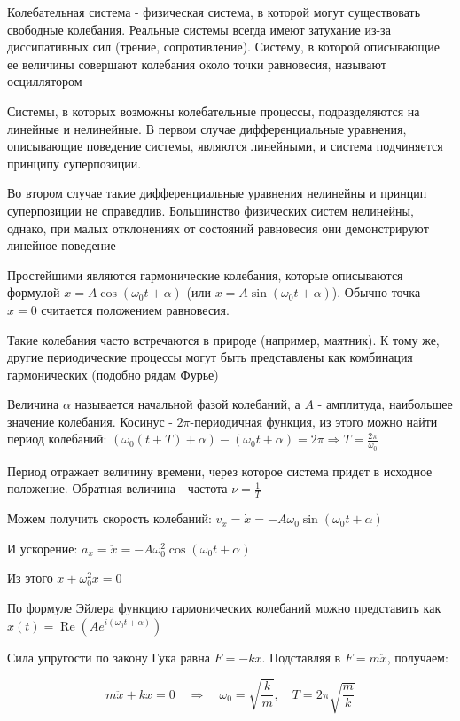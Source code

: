 \documentclass[12pt]{article}
\begin{document}
Колебательная система - физическая система, в которой могут существовать свободные колебания. 
Реальные системы всегда имеют затухание из-за диссипативных сил (трение, сопротивление).
Систему, в которой описывающие ее величины совершают колебания около точки равновесия, называют осциллятором

Системы, в которых возможны колебательные процессы, подразделяются на линейные и нелинейные.
В первом случае дифференциальные уравнения, описывающие поведение системы, являются линейными, 
и система подчиняется принципу суперпозиции.

Во втором случае такие дифференциальные уравнения нелинейны и принцип суперпозиции не справедлив. Большинство
физических систем нелинейны, однако, при малых отклонениях от состояний равновесия они демонстрируют линейное поведение

\mediumvspace

Простейшими являются гармонические колебания, которые описываются формулой $x = A \cos (\omega_0 t + \alpha)$ 
(или $x = A \sin (\omega_0 t + \alpha)$). Обычно точка $x = 0$ считается положением равновесия. 

Такие колебания часто встречаются в природе (например, маятник). К тому же, другие периодические процессы 
могут быть представлены как комбинация гармонических (подобно рядам Фурье)

Величина $\alpha$ называется начальной фазой колебаний, а $A$ - амплитуда, наибольшее значение колебания. 
Косинус - $2\pi$-периодичная функция, из этого можно найти период колебаний: $(\omega_0 (t + T) + \alpha) - (\omega_0 t + \alpha) = 2\pi \Longrightarrow T = \frac{2\pi}{\omega_0}$

Период отражает величину времени, через которое система придет в исходное положение. Обратная величина - частота $\nu = \frac{1}{T}$

Можем получить скорость колебаний: $v_x = \dot x = -A \omega_0 \sin (\omega_0 t + \alpha)$

И ускорение: $a_x = \ddot x = -A \omega_0^2 \cos (\omega_0 t + \alpha)$

Из этого $\ddot x + \omega_0^2 x = 0$

По формуле Эйлера функцию гармонических колебаний можно представить как $x(t) = \operatorname{Re} (Ae^{i(\omega_0 t + \alpha)})$

 Сила упругости по закону Гука равна $F = -kx$. Подставляя в $F = m\ddot{x}$, получаем:

\[
m\ddot{x} + kx = 0 \quad \Longrightarrow \quad \omega_0 = \sqrt{\frac{k}{m}}, \quad T = 2\pi\sqrt{\frac{m}{k}}
\]
\end{document}
